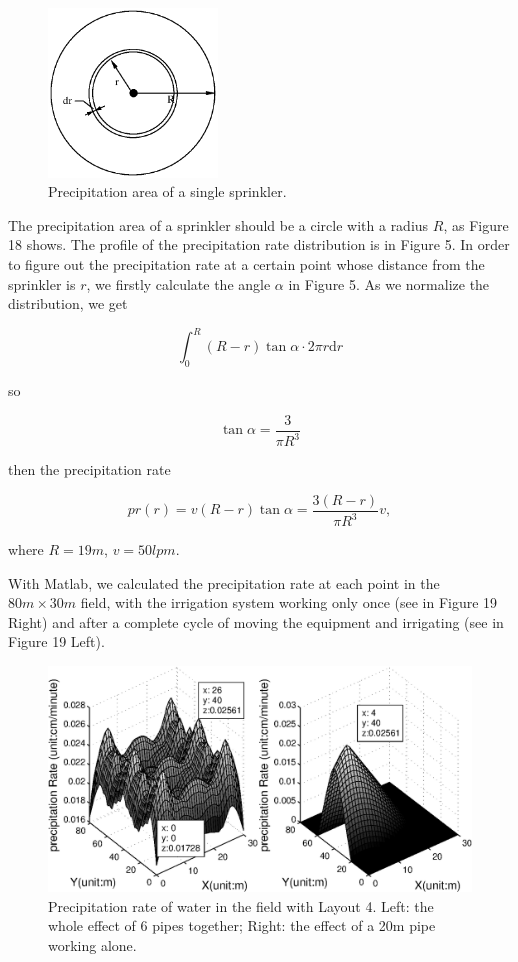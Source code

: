 \documentclass[12pt,a4paper,titlepage]{article}
\begin{document}
\begin{figure}[!htb]
\centering
\includegraphics[width=0.4\textwidth]{fig18.eps}
\caption{\label{fig18} Precipitation area of a single sprinkler.}
\end{figure}

The precipitation area of a sprinkler should be a circle with a
radius $R$, as Figure 18 shows. The profile of the precipitation
rate distribution is in Figure 5. In order to figure out the
precipitation rate at a certain point whose distance from the
sprinkler is $r$, we firstly calculate the angle $\alpha$ in
Figure 5. As we normalize the distribution, we get

\[
\int_0^R(R-r)\tan\alpha\cdot2\pi r \textrm{d}r
\]

so

\[
\tan\alpha=\frac{3}{\pi R^3}
\]

then the precipitation rate

\[
pr(r)=v(R-r)\tan\alpha=\frac{3(R-r)}{\pi R^3}v,
\]

where $R=19m$, $v=50lpm$.

With Matlab, we calculated the precipitation rate at each point in
the $80m\times30m$ field, with the irrigation system working only
once (see in Figure 19 Right) and after a complete cycle of moving
the equipment and irrigating (see in Figure 19 Left).

\begin{figure}[!htb]
\centering
\includegraphics[width=1\textwidth]{fig19.eps}
\caption{\label{fig19} Precipitation rate of water in the field
with Layout 4. Left: the whole effect of 6 pipes together; Right:
the effect of a 20m pipe working alone.}
\end{figure}
\end{document}
